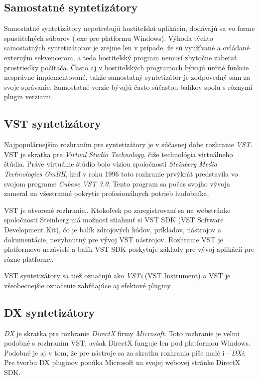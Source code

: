 \subsection{Samostatné syntetizátory}
Samostatné syntetizátory nepotrebujú hostiteľskú aplikáciu, dodávajú sa vo forme spustiteľných súborov (.exe pre platformu Windows). Výhoda týchto samostatných syntetizátorov je zrejme len v prípade, že sú využívané a ovládané externým sekvencerom, a teda hostiteľský program nemusí zbytočne zaberať prostriedky počítača. Často aj v hostiteľských programoch bývajú určité funkcie nesprávne implementované, takže samostatný syntetizátor je zodpovedný sám za svoje správanie. Samostatné verzie bývajú často súčasťou balíkov spolu s rôznymi plugin verziami.

\subsection{VST syntetizátory}
Najpopulárnejším rozhraním pre syntetizátory je v súčasnej dobe rozhranie \emph{VST}. VST je skratka pre \emph{Virtual Studio Technology}, čiže technológia virtuálneho štúdia. Práve virtuálne štúdio bolo víziou spoločnosti \emph{Steinberg Media Technologies GmBH}, keď v roku 1996 toto rozhranie prvýkrát predstavila vo svojom programe \emph{Cubase VST 3.0}. Tento program sa počas svojho vývoja zameral na všestranné pokrytie profesionálnych potrieb hudobníka.

VST je otvorené rozhranie,. Ktokoľvek po zaregistrovaní sa na webstránke spoločnosti Steinberg má možnosť stiahnuť si VST SDK (VST Software Development Kit), čo je balík zdrojových kódov, príkladov, nástrojov a dokumentácie, nevyhnutný pre vývoj VST nástrojov. Rozhranie VST je platformovo nezávislé a balík VST SDK poskytuje základy pre vývoj aplikácií pre rôzne platformy.
  
VST syntetizátory sa tiež označujú ako \emph{VSTi} (VST Instrument) a VST je všeobecnejšie označenie zahŕňajúce aj efektové pluginy.

\subsection{DX syntetizátory}

\emph{DX} je skratka pre rozhranie \emph{DirectX} firmy \emph{Microsoft}. Toto rozhranie je veľmi podobné s rozhraním VST, avšak DirectX funguje len pod platformou Windows. Podobné je aj v tom, že pre nástroje sa za skratku rozhrania píše malé \bq i\eq \,-- \emph{DXi}. Pre tvorbu DX pluginov ponúka Microsoft na svojej webovej stránke DirectX SDK.

